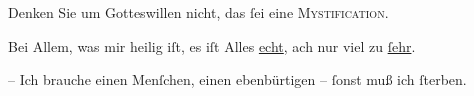 \pstart
           Denken Sie um Gotteswillen nicht, das{ }ſei eine \textsc{Mystification}.\pend
           
\pstart
           Bei Allem, was mir heilig iſt, es iſt Alles \uline{echt},
                  ach nur viel zu \uline{ſehr}.\pend
           
\pstart
           – Ich brauche einen Menſchen, einen ebenbürtigen –{ }ſonst muß ich{ }ſterben.\pend
           \endnumbering{}
\begin{anhang}
\end{anhang}\newcommand{\dateiname}{L04551}\newcommand{\titel}{Hermione von Preuschen an Arthur Schnitzler, 4. 6. 1904}\newcommand{\editorInnen}{Herausgegeben von Jahnke, SelmaMüller, Martin Anton}
